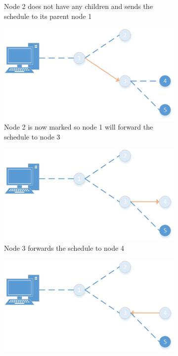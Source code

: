 \begin{figure}[htbp]
\begin{subfigure}[t]{0.4\textwidth}
        \caption{Node 2 does not have any children and sends the schedule to its parent node 1}
        \label{fig:spreading3}
    \end{subfigure}
    \quad
    \quad
    \begin{subfigure}[t]{0.4\textwidth}
		\centering         
        \includegraphics[scale=0.6]{content/images/ScheduleSpreading/Part4}
        \caption{Node 2 is now marked so node 1 will forward the schedule to node 3}
        \label{fig:spreading4}
    \end{subfigure}
    \quad
    \quad
    \begin{subfigure}[t]{0.4\textwidth}
		\centering         
        \includegraphics[scale=0.6]{content/images/ScheduleSpreading/Part5}
        \caption{Node 3 forwards the schedule to node 4}
        \label{fig:spreading5}
    \end{subfigure}
    \quad
    \quad
    \begin{subfigure}[t]{0.4\textwidth}
		\centering         
        \includegraphics[scale=0.6]{content/images/ScheduleSpreading/Part6}

\end{subfigure}
\end{figure}
